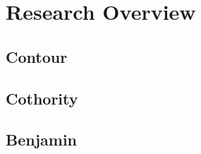 \documentclass[../Main/thesis.tex]{subfiles}
\begin{document}
\chapter{Research Overview}\label{ch:research_overview}

\section{Contour}\label{sec:contour}

\section{Cothority}\label{sec:cothority}

\section{Benjamin}\label{sec:benjamin}

\blankpage
\end{document}
